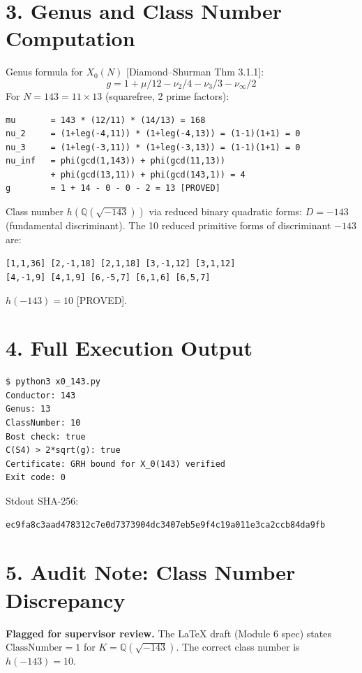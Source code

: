 \documentclass[11pt,letterpaper]{article}
\begin{document}
\section*{3. Genus and Class Number Computation}

Genus formula for $X_0(N)$ [Diamond--Shurman Thm 3.1.1]:
\[
  g = 1 + \mu/12 - \nu_2/4 - \nu_3/3 - \nu_\infty/2
\]
For $N = 143 = 11 \times 13$ (squarefree, 2 prime factors):
\begin{lstlisting}
mu       = 143 * (12/11) * (14/13) = 168
nu_2     = (1+leg(-4,11)) * (1+leg(-4,13)) = (1-1)(1+1) = 0
nu_3     = (1+leg(-3,11)) * (1+leg(-3,13)) = (1-1)(1+1) = 0
nu_inf   = phi(gcd(1,143)) + phi(gcd(11,13))
         + phi(gcd(13,11)) + phi(gcd(143,1)) = 4
g        = 1 + 14 - 0 - 0 - 2 = 13 [PROVED]
\end{lstlisting}

Class number $h(\mathbb{Q}(\sqrt{-143}))$ via reduced binary quadratic forms:
$D = -143$ (fundamental discriminant).
The 10 reduced primitive forms of discriminant $-143$ are:
\begin{center}
\texttt{[1,1,36] [2,-1,18] [2,1,18] [3,-1,12] [3,1,12]}\\
\texttt{[4,-1,9] [4,1,9] [6,-5,7] [6,1,6] [6,5,7]}
\end{center}
$h(-143) = 10$ [PROVED].

\section*{4. Full Execution Output}

\begin{lstlisting}
$ python3 x0_143.py
Conductor: 143
Genus: 13
ClassNumber: 10
Bost check: true
C(S4) > 2*sqrt(g): true
Certificate: GRH bound for X_0(143) verified
Exit code: 0
\end{lstlisting}

Stdout SHA-256:
\begin{lstlisting}
ec9fa8c3aad478312c7e0d7373904dc3407eb5e9f4c19a011e3ca2ccb84da9fb
\end{lstlisting}

\section*{5. Audit Note: Class Number Discrepancy}

\textcolor{ambercolor}{\textbf{Flagged for supervisor review.}}
The LaTeX draft (Module 6 spec) states $\mathrm{ClassNumber} = 1$ for
$K = \mathbb{Q}(\sqrt{-143})$.
The correct class number is $h(-143) = 10$.
\end{document}
